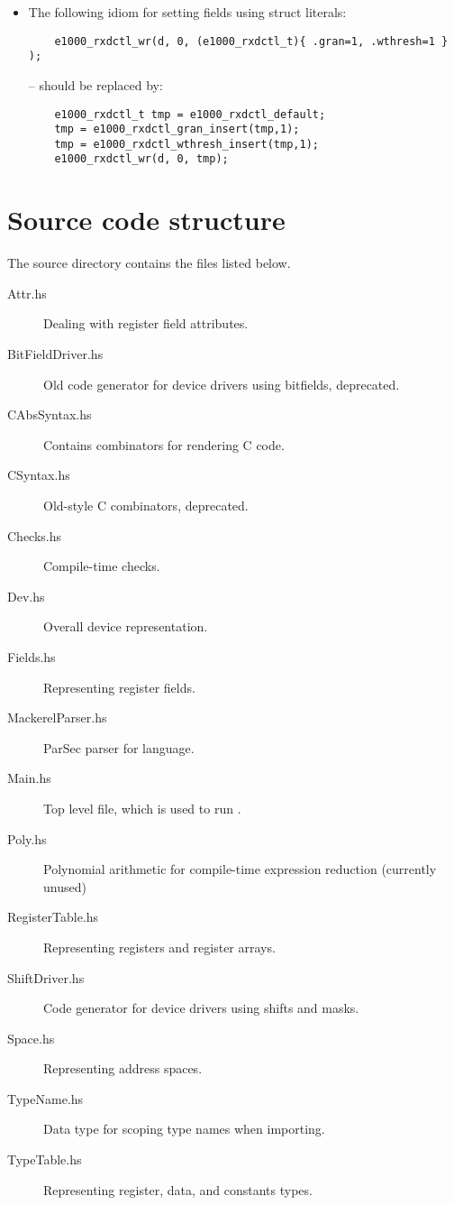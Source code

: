 \documentclass[a4paper,11pt,twoside]{report}
\begin{document}
\begin{itemize}
\item The following idiom for setting fields using struct literals:

\begin{verbatim}
    e1000_rxdctl_wr(d, 0, (e1000_rxdctl_t){ .gran=1, .wthresh=1 } );
\end{verbatim}

 -- should be replaced by:

\begin{verbatim}
    e1000_rxdctl_t tmp = e1000_rxdctl_default;
    tmp = e1000_rxdctl_gran_insert(tmp,1);
    tmp = e1000_rxdctl_wthresh_insert(tmp,1);
    e1000_rxdctl_wr(d, 0, tmp);
\end{verbatim}
\end{itemize}

\chapter{Source code structure}\label{chap:sourcetree}

The \Mac source directory contains the files listed below.

\begin{description}

\item[Attr.hs] Dealing with register field attributes.
\item[BitFieldDriver.hs] Old code generator for device drivers using
  bitfields, deprecated.
\item[CAbsSyntax.hs] Contains combinators for rendering C code.
\item[CSyntax.hs] Old-style C combinators, deprecated.
\item[Checks.hs] Compile-time checks.
\item[Dev.hs] Overall device representation.
\item[Fields.hs] Representing register fields.
\item[MackerelParser.hs] ParSec parser for language.
\item[Main.hs] Top level file, which is used to run \Mac.
\item[Poly.hs] Polynomial arithmetic for compile-time expression
  reduction (currently unused)
\item[RegisterTable.hs] Representing registers and register arrays.
\item[ShiftDriver.hs] Code generator for device drivers using shifts and masks.
\item[Space.hs] Representing address spaces.
\item[TypeName.hs] Data type for scoping type names when importing.
\item[TypeTable.hs] Representing register, data, and constants types.
\end{description}
\end{document}

